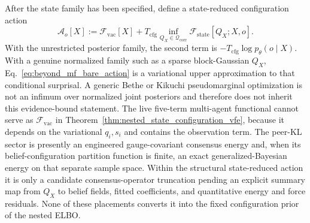 \documentclass[11pt]{article}
\begin{document}
After the state family has been specified, define a state-reduced configuration action
\begin{equation}
\mathcal{A}_o[X]
:=\mathcal{F}_{\mathrm{vac}}[X]
+T_{\mathrm{cfg}}
\inf_{Q_X\in\mathcal{Q}_{\mathrm{corr}}}
\mathcal{F}_{\mathrm{state}}[Q_X;X,o].
\label{eq:beyond_mf_bare_action}
\end{equation}
With the unrestricted posterior family, the second term is $-T_{\mathrm{cfg}}\log p_\theta(o\mid X)$. With a genuine normalized family such as a sparse block-Gaussian $Q_X$, Eq.~\eqref{eq:beyond_mf_bare_action} is a variational upper approximation to that conditional surprisal. A generic Bethe or Kikuchi pseudomarginal optimization is not an infimum over normalized joint posteriors and therefore does not inherit this evidence-bound statement. The live five-term multi-agent functional cannot serve as $\mathcal{F}_{\mathrm{vac}}$ in Theorem~\ref{thm:nested_state_configuration_vfe}, because it depends on the variational $q_i,s_i$ and contains the observation term. The peer-KL sector is presently an engineered gauge-covariant consensus energy and, when its belief-configuration partition function is finite, an exact generalized-Bayesian energy on that separate sample space. Within the structural state-reduced action it is only a candidate consensus-operator truncation pending an explicit summary map from $Q_X$ to belief fields, fitted coefficients, and quantitative energy and force residuals. None of these placements converts it into the fixed configuration prior of the nested ELBO.
\end{document}
